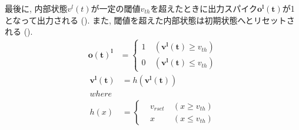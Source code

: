 最後に, 内部状態$v^l(t)$が一定の閾値$v_{th}$を超えたときに出力スパイク$\bm{o^l(t)}$が1となって出力される ().
また, 閾値を超えた内部状態は初期状態へとリセットされる ().
\begin{equation}
    \begin{split}
      \bm{o(t)^{l}}&=\left\{
        \begin{alignedat}{2}
          1 &\:(\bm{v^l(t)}{\geq}v_{th})\\
          0 &\:(\bm{v^l(t)}{\leq}v_{th})
        \end{alignedat}
      \right. 
    \end{split} \label{eq:outputSpike}
  \end{equation}
  \begin{equation}
    \begin{split}
      \bm{v^l(t)}&=h(\bm{v^l(t)})\\
    where\\
    h(x)&=\left\{
      \begin{alignedat}{2}
        &v_{rset} &\:(x{\geq}v_{th})\\
        &x &\:(x{\leq}v_{th})
      \end{alignedat}
    \right. 
    \end{split} \label{eq:outputSpike2}
  \end{equation}
